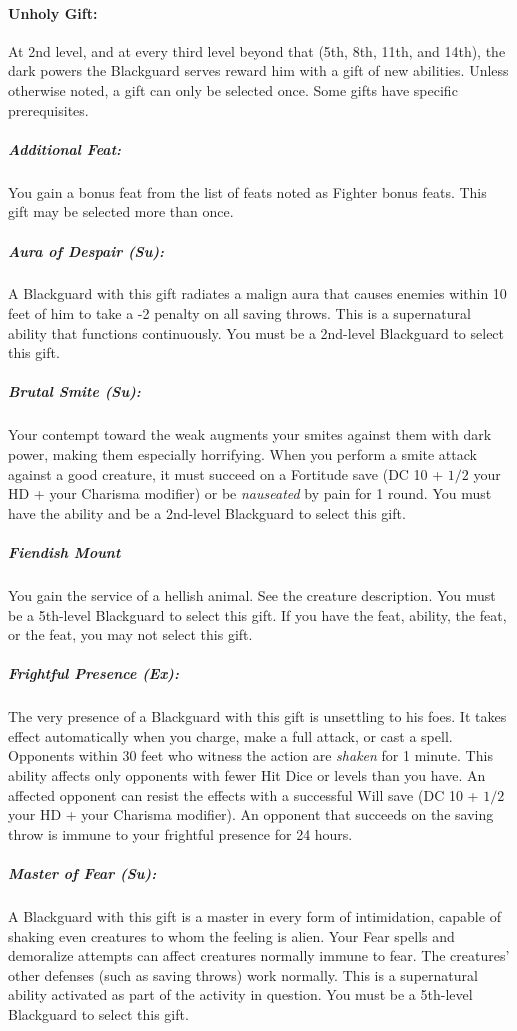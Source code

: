 \paragraph{Unholy Gift:}
At 2nd level, and at every third level beyond that (5th, 8th, 11th, and 14th), the dark powers the Blackguard serves reward him with a gift of new abilities. Unless otherwise noted, a gift can only be selected once. Some gifts have specific prerequisites.

\subparagraph{Additional Feat:}
You gain a bonus feat from the list of feats noted as Fighter bonus feats.
This gift may be selected more than once.

\subparagraph{Aura of Despair (Su):}
A Blackguard with this gift radiates a malign aura that causes enemies within 10 feet of him to take a -2 penalty on all saving throws. This is a supernatural ability that functions continuously. You must be a 2nd-level Blackguard to select this gift.

\subparagraph{Brutal Smite (Su):}
Your contempt toward the weak augments your smites against them with dark power, making them especially horrifying.
When you perform a smite attack against a good creature, it must succeed on a Fortitude save (DC 10 + $1/2$ your HD + your Charisma modifier) or be \emph{nauseated} by pain for 1 round. You must have the  ability and be a 2nd-level Blackguard to select this gift.

\subparagraph{Fiendish Mount}
\label{sec:FiendishMountListing}
You gain the service of a hellish animal. See the  creature description. You must be a 5th-level Blackguard to select this gift. If you have the  feat,  ability, the  feat, or the  feat, you may not select this gift.

\subparagraph{Frightful Presence (Ex):}
The very presence of a Blackguard with this gift is unsettling to his foes. 
It takes effect automatically when you charge, make a full attack, or cast a spell. 
Opponents within 30 feet who witness the action are \emph{shaken} for 1 minute.
This ability affects only opponents with fewer Hit Dice or levels than you have. 
An affected opponent can resist the effects with a successful Will save (DC 10 + $1/2$ your HD + your Charisma modifier). 
An opponent that succeeds on the saving throw is immune to your frightful presence for 24 hours.

\subparagraph{Master of Fear (Su):}
A Blackguard with this gift is a master in every form of intimidation, capable of shaking even creatures to whom the feeling is alien. Your Fear spells and demoralize attempts can affect creatures normally immune to fear. The creatures' other defenses (such as saving throws) work normally. This is a supernatural ability activated as part of the activity in question.
You must be a 5th-level Blackguard to select this gift.

